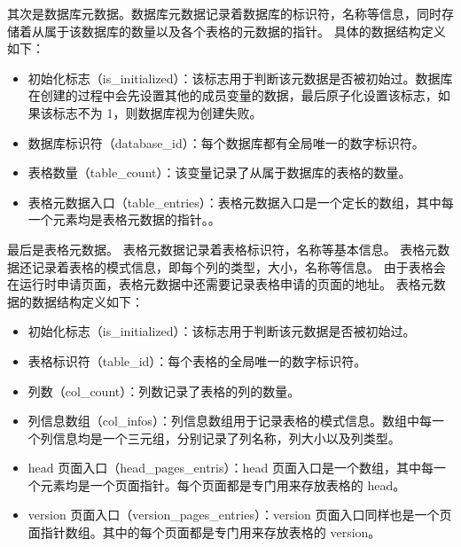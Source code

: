 其次是数据库元数据。数据库元数据记录着数据库的标识符，名称等信息，同时存储着从属于该数据库的数量以及各个表格的元数据的指针。
具体的数据结构定义如下：
\begin{itemize}
    \item 初始化标志（is\_initialized）：该标志用于判断该元数据是否被初始过。数据库在创建的过程中会先设置其他的成员变量的数据，最后原子化设置该标志，如果该标志不为 1，则数据库视为创建失败。
    \item 数据库标识符（database\_id）：每个数据库都有全局唯一的数字标识符。
    \item 表格数量（table\_count）：该变量记录了从属于数据库的表格的数量。
    \item 表格元数据入口（table\_entries）：表格元数据入口是一个定长的数组，其中每一个元素均是表格元数据的指针。。
\end{itemize}

最后是表格元数据。
表格元数据记录着表格标识符，名称等基本信息。
表格元数据还记录着表格的模式信息，即每个列的类型，大小，名称等信息。
由于表格会在运行时申请页面，表格元数据中还需要记录表格申请的页面的地址。
表格元数据的数据结构定义如下：
\begin{itemize}
    \item 初始化标志（is\_initialized）：该标志用于判断该元数据是否被初始过。
    \item 表格标识符（table\_id）：每个表格的全局唯一的数字标识符。
    \item 列数（col\_count）：列数记录了表格的列的数量。
    \item 列信息数组（col\_infos）：列信息数组用于记录表格的模式信息。数组中每一个列信息均是一个三元组，分别记录了列名称，列大小以及列类型。
    \item head 页面入口（head\_pages\_entris）：head 页面入口是一个数组，其中每一个元素均是一个页面指针。每个页面都是专门用来存放表格的 head。
    \item version 页面入口（version\_pages\_entries）：version 页面入口同样也是一个页面指针数组。其中的每个页面都是专门用来存放表格的 version。
\end{itemize}


